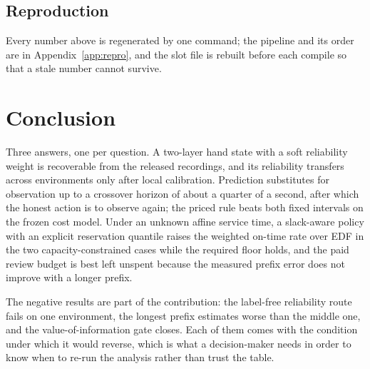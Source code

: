 \documentclass{swmcmthesis}
\begin{document}
\subsection{Reproduction}

Every number above is regenerated by one command; the pipeline and its order are in
Appendix~\ref{app:repro}, and the slot file is rebuilt before each compile so that a
stale number cannot survive.

\section{Conclusion}
\label{sec:concl}

Three answers, one per question. A two-layer hand state with a soft reliability
weight is recoverable from the released recordings, and its reliability transfers
across environments only after local calibration. Prediction substitutes for
observation up to a crossover horizon of about a quarter of a second, after which
the honest action is to observe again; the priced rule beats both fixed intervals
on the frozen cost model. Under an unknown affine service time, a slack-aware
policy with an explicit reservation quantile raises the weighted on-time rate over
EDF in the two capacity-constrained cases while the required floor holds, and the
paid review budget is best left unspent because the measured prefix error does not
improve with a longer prefix.

The negative results are part of the contribution: the label-free reliability route
fails on one environment, the longest prefix estimates worse than the middle one,
and the value-of-information gate closes. Each of them comes with the condition
under which it would reverse, which is what a decision-maker needs in order to know
when to re-run the analysis rather than trust the table.
\end{document}
